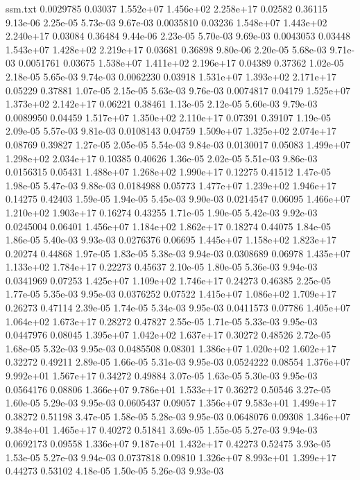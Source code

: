 \begin{filecontents}{ssm.txt}
0.0029785 0.03037 1.552e+07 1.456e+02 2.258e+17 0.02582 0.36115 9.13e-06 2.25e-05 5.73e-03 9.67e-03
0.0035810 0.03236 1.548e+07 1.443e+02 2.240e+17 0.03084 0.36484 9.44e-06 2.23e-05 5.70e-03 9.69e-03
0.0043053 0.03448 1.543e+07 1.428e+02 2.219e+17 0.03681 0.36898 9.80e-06 2.20e-05 5.68e-03 9.71e-03
0.0051761 0.03675 1.538e+07 1.411e+02 2.196e+17 0.04389 0.37362 1.02e-05 2.18e-05 5.65e-03 9.74e-03
0.0062230 0.03918 1.531e+07 1.393e+02 2.171e+17 0.05229 0.37881 1.07e-05 2.15e-05 5.63e-03 9.76e-03
0.0074817 0.04179 1.525e+07 1.373e+02 2.142e+17 0.06221 0.38461 1.13e-05 2.12e-05 5.60e-03 9.79e-03
0.0089950 0.04459 1.517e+07 1.350e+02 2.110e+17 0.07391 0.39107 1.19e-05 2.09e-05 5.57e-03 9.81e-03
0.0108143 0.04759 1.509e+07 1.325e+02 2.074e+17 0.08769 0.39827 1.27e-05 2.05e-05 5.54e-03 9.84e-03
0.0130017 0.05083 1.499e+07 1.298e+02 2.034e+17 0.10385 0.40626 1.36e-05 2.02e-05 5.51e-03 9.86e-03
0.0156315 0.05431 1.488e+07 1.268e+02 1.990e+17 0.12275 0.41512 1.47e-05 1.98e-05 5.47e-03 9.88e-03
0.0184988 0.05773 1.477e+07 1.239e+02 1.946e+17 0.14275 0.42403 1.59e-05 1.94e-05 5.45e-03 9.90e-03
0.0214547 0.06095 1.466e+07 1.210e+02 1.903e+17 0.16274 0.43255 1.71e-05 1.90e-05 5.42e-03 9.92e-03
0.0245004 0.06401 1.456e+07 1.184e+02 1.862e+17 0.18274 0.44075 1.84e-05 1.86e-05 5.40e-03 9.93e-03
0.0276376 0.06695 1.445e+07 1.158e+02 1.823e+17 0.20274 0.44868 1.97e-05 1.83e-05 5.38e-03 9.94e-03
0.0308689 0.06978 1.435e+07 1.133e+02 1.784e+17 0.22273 0.45637 2.10e-05 1.80e-05 5.36e-03 9.94e-03
0.0341969 0.07253 1.425e+07 1.109e+02 1.746e+17 0.24273 0.46385 2.25e-05 1.77e-05 5.35e-03 9.95e-03
0.0376252 0.07522 1.415e+07 1.086e+02 1.709e+17 0.26273 0.47114 2.39e-05 1.74e-05 5.34e-03 9.95e-03
0.0411573 0.07786 1.405e+07 1.064e+02 1.673e+17 0.28272 0.47827 2.55e-05 1.71e-05 5.33e-03 9.95e-03
0.0447976 0.08045 1.395e+07 1.042e+02 1.637e+17 0.30272 0.48526 2.72e-05 1.68e-05 5.32e-03 9.95e-03
0.0485508 0.08301 1.386e+07 1.020e+02 1.602e+17 0.32272 0.49211 2.89e-05 1.66e-05 5.31e-03 9.95e-03
0.0524222 0.08554 1.376e+07 9.992e+01 1.567e+17 0.34272 0.49884 3.07e-05 1.63e-05 5.30e-03 9.95e-03
0.0564176 0.08806 1.366e+07 9.786e+01 1.533e+17 0.36272 0.50546 3.27e-05 1.60e-05 5.29e-03 9.95e-03
0.0605437 0.09057 1.356e+07 9.583e+01 1.499e+17 0.38272 0.51198 3.47e-05 1.58e-05 5.28e-03 9.95e-03
0.0648076 0.09308 1.346e+07 9.384e+01 1.465e+17 0.40272 0.51841 3.69e-05 1.55e-05 5.27e-03 9.94e-03
0.0692173 0.09558 1.336e+07 9.187e+01 1.432e+17 0.42273 0.52475 3.93e-05 1.53e-05 5.27e-03 9.94e-03
0.0737818 0.09810 1.326e+07 8.993e+01 1.399e+17 0.44273 0.53102 4.18e-05 1.50e-05 5.26e-03 9.93e-03

\end{filecontents}
